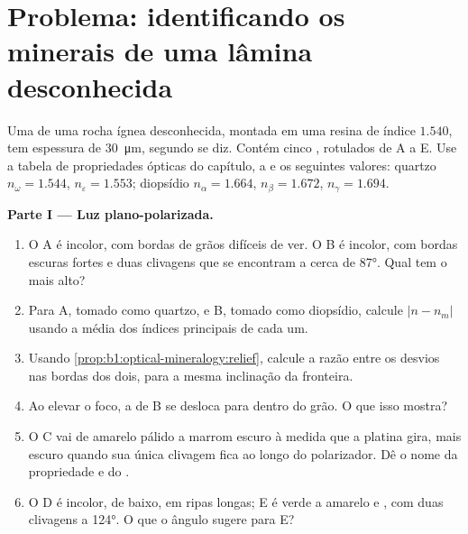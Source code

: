 \section{Problema: identificando os minerais de uma lâmina desconhecida}

\begin{problem}
\label{pb:b1:optical-mineralogy:1}
Uma  de uma rocha ígnea desconhecida, montada em uma resina de índice
$1.540$, tem espessura de \qty{30}{\micro m}, segundo se diz. Contém cinco , rotulados de A a E. Use a tabela de propriedades ópticas do capítulo, a  e os seguintes valores: quartzo $n_\omega = 1.544$,
$n_\varepsilon = 1.553$; diopsídio $n_\alpha = 1.664$, $n_\beta = 1.672$,
$n_\gamma = 1.694$.

\medskip
\noindent\textbf{Parte I --- Luz plano-polarizada.}
\begin{enumerate}
  \item O  A é incolor, com bordas de grãos difíceis de ver. O  B é incolor, com bordas escuras fortes e duas clivagens que se encontram a cerca de \ang{87}. Qual tem o  mais alto?
  \item Para A, tomado como quartzo, e B, tomado como diopsídio, calcule $|n - n_m|$ usando a média dos índices principais de cada um.
  \item Usando \cref{prop:b1:optical-mineralogy:relief}, calcule a razão entre os desvios nas bordas dos dois, para a mesma inclinação da fronteira.
  \item Ao elevar o foco, a  de B se desloca para dentro do grão. O que isso mostra?
  \item O  C vai de amarelo pálido a marrom escuro à medida que a platina gira, mais escuro quando sua única clivagem fica ao longo do polarizador. Dê o nome da propriedade e do .
  \item O  D é incolor, de  baixo, em ripas longas; E é verde a amarelo e , com duas clivagens a \ang{124}. O que o ângulo sugere para E?
\end{enumerate}


\end{problem}
